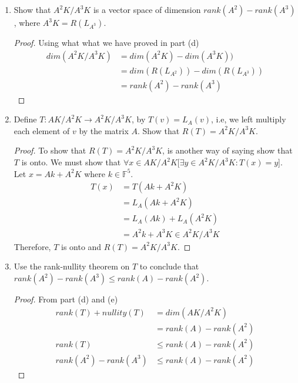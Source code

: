 \documentclass[11pt]{scrartcl}
\begin{document}
\begin{enumerate}[label=\alph*.]
{\begin{proof}
		      It follows from part (c) and Theorem 3.5 that
		      \begin{align*}
			      dim(AK/A^2K) & = dim(AK) - dim(A^2K))          \\
			                   & = dim(R(L_A)) - dim(R(L_{A^2})) \\
			                   & = rank(A) - rank(A^2)
		      \end{align*}
	      \end{proof}
	      }
	\item{
	      Show that $A^2K/A^3K$ is a vector space of dimension $rank(A^2) - rank(A^3)$, where $A^3K= R(L_{A^3})$.
	      \begin{proof}
		      Using what what we have proved in part (d)
		      \begin{align*}
			      dim(A^2K/A^3K) & = dim(A^2K) - dim(A^3K))            \\
			                     & = dim(R(L_{A^2})) - dim(R(L_{A^3})) \\
			                     & = rank(A^2) - rank(A^3)
		      \end{align*}
	      \end{proof}
	      }
	\item{
	      Define $T: AK/A^2K \rightarrow A^2K/A^3K$, by $T(v) = L_A(v)$, i.e, we left multiply each element of $v$ by the matrix $A$.
	      Show that $R(T) = A^2K/A^3K$.
	      \begin{proof}
		      To show that $R(T) = A^2K/A^3K$, is another way of saying show that $T$ is onto.
		      We must show that $\forall x \in AK/A^2K [\exists y \in A^2K/A^3K : T(x) = y$].
		      Let $x = Ak + A^2K$ where $k \in \mathbb{F}^5$.
		      \begin{align*}
			      T(x) & = T(Ak + A^2K) \\
					   & = L_A(Ak + A^2K) \\
					   & = L_A(Ak) + L_A(A^2K) \\
					   & = A^2k + A^3K \in A^2K/A^3K
			  \end{align*}
			  Therefore, $T$ is onto and $R(T) = A^2K/A^3K$.
	      \end{proof}
	      }
	\item{
	      Use the rank-nullity theorem on $T$ to conclude that $rank(A^2) - rank(A^3) \leq rank(A) - rank(A^2)$.
		  \begin{proof}
			From part (d) and (e)
			\begin{align*}
			  rank(T) + nullity(T) & = dim(AK/A^2K) \\
			  & = rank(A) - rank(A^2) \\
			  rank(T) & \leq rank(A) - rank(A^2) \\ 
			  rank(A^2) - rank(A^3) & \leq rank(A) - rank(A^2)
			\end{align*}
		  \end{proof}
	      }
\end{enumerate}
\end{document}
